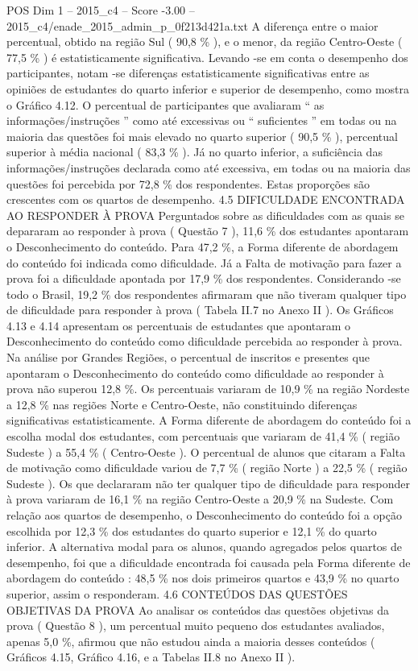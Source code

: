 \begin{textsample}{POS Dim 1 – 2015\_c4 – Score -3.00 – 2015\_c4/enade\_2015\_admin\_p\_0f213d421a.txt}
A diferença entre o maior percentual, obtido na região Sul ( 90,8 \% ), e o menor, da região Centro-Oeste ( 77,5 \% ) é estatisticamente significativa.
Levando -se em conta o desempenho dos participantes, notam -se diferenças estatisticamente significativas entre as opiniões de estudantes do quarto inferior e superior de desempenho, como mostra o Gráfico 4.12.
O percentual de participantes que avaliaram “ as informações/instruções ” como até excessivas ou “ suficientes ” em todas ou na maioria das questões foi mais elevado no quarto superior ( 90,5 \% ), percentual superior à média nacional ( 83,3 \% ).
Já no quarto inferior, a suficiência das informações/instruções declarada como até excessiva, em todas ou na maioria das questões foi percebida por 72,8 \% dos respondentes.
Estas proporções são crescentes com os quartos de desempenho. 4.5 DIFICULDADE ENCONTRADA AO RESPONDER À PROVA Perguntados sobre as dificuldades com as quais se depararam ao responder à prova ( Questão 7 ), 11,6 \% dos estudantes apontaram o Desconhecimento do conteúdo.
Para 47,2 \%, a Forma diferente de abordagem do conteúdo foi indicada como dificuldade.
Já a Falta de motivação para fazer a prova foi a dificuldade apontada por 17,9 \% dos respondentes.
Considerando -se todo o Brasil, 19,2 \% dos respondentes afirmaram que não tiveram qualquer tipo de dificuldade para responder à prova ( Tabela II.7 no Anexo II ).
Os Gráficos 4.13 e 4.14 apresentam os percentuais de estudantes que apontaram o Desconhecimento do conteúdo como dificuldade percebida ao responder à prova.
Na análise por Grandes Regiões, o percentual de inscritos e presentes que apontaram o Desconhecimento do conteúdo como dificuldade ao responder à prova não superou 12,8 \%.
Os percentuais variaram de 10,9 \% na região Nordeste a 12,8 \% nas regiões Norte e Centro-Oeste, não constituindo diferenças significativas estatisticamente.
A Forma diferente de abordagem do conteúdo foi a escolha modal dos estudantes, com percentuais que variaram de 41,4 \% ( região Sudeste ) a 55,4 \% ( Centro-Oeste ).
O percentual de alunos que citaram a Falta de motivação como dificuldade variou de 7,7 \% ( região Norte ) a 22,5 \% ( região Sudeste ).
Os que declararam não ter qualquer tipo de dificuldade para responder à prova variaram de 16,1 \% na região Centro-Oeste a 20,9 \% na Sudeste.
Com relação aos quartos de desempenho, o Desconhecimento do conteúdo foi a opção escolhida por 12,3 \% dos estudantes do quarto superior e 12,1 \% do quarto inferior.
A alternativa modal para os alunos, quando agregados pelos quartos de desempenho, foi que a dificuldade encontrada foi causada pela Forma diferente de abordagem do conteúdo : 48,5 \% nos dois primeiros quartos e 43,9 \% no quarto superior, assim o responderam. 4.6 CONTEÚDOS DAS QUESTÕES OBJETIVAS DA PROVA Ao analisar os conteúdos das questões objetivas da prova ( Questão 8 ), um percentual muito pequeno dos estudantes avaliados, apenas 5,0 \%, afirmou que não estudou ainda a maioria desses conteúdos ( Gráficos 4.15, Gráfico 4.16, e a Tabelas II.8 no Anexo II ).

\end{textsample}
